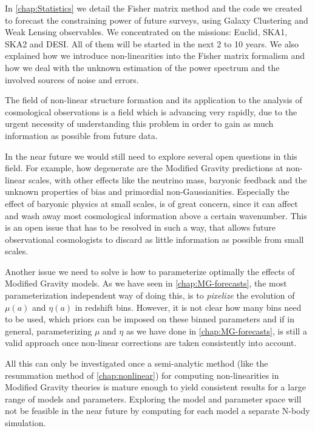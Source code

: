 In \cref{chap:Statistics} we detail the Fisher matrix method and the code we created to forecast the
constraining power of future surveys, using Galaxy Clustering and Weak Lensing observables. We concentrated on the missions: 
Euclid, SKA1, SKA2 and DESI. All of them will be started in the next 2 to 10 years.
We also explained how we introduce non-linearities into the Fisher matrix formalism and how we deal with the unknown 
estimation of the power spectrum and the involved sources of noise and errors.

The field of non-linear structure formation and its application to the analysis of cosmological observations
is a field which is advancing very rapidly, due to the urgent necessity of understanding this problem in order
to gain as much information as possible from future data.

In the near future we would still need to explore several open questions in this field.
For example, how degenerate are the Modified Gravity predictions at non-linear scales, with other
effects like the neutrino mass, baryonic feedback and the unknown properties of bias and primordial non-Gaussianities.
Especially the effect of baryonic physics at small scales, is of great concern, since it can affect and wash away
most cosmological information above a certain wavenumber. This is an open issue that has to be resolved in such a way, that allows 
future observational cosmologists to discard as little information as possible from small scales.

Another issue we need to solve is how to parameterize optimally the effects of Modified Gravity models. As we have seen 
in \cref{chap:MG-forecasts}, the most parameterization independent way of doing this, is to \emph{pixelize} the evolution
of $\mu(a)$ and $\eta(a)$ in redshift bins. However, it is not clear how many bins need to be used, which
priors can be imposed on these binned parameters and if in general, parameterizing $\mu$ and $\eta$ as we have done in 
\cref{chap:MG-forecasts}, is still a valid approach once non-linear corrections are taken consistently into account.

All this can only be investigated once a semi-analytic method (like the resummation method of \cref{chap:nonlinear}) 
for computing non-linearities in Modified Gravity theories is mature enough to yield consistent results for 
a large range of models and parameters. Exploring
the model and parameter space will not be feasible in the near future by computing for each model a separate N-body simulation.

